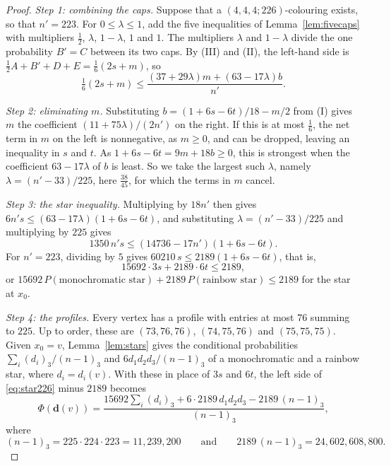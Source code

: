 \documentclass[11pt]{article}
\theoremstyle{spacedplain}
\theoremstyle{spaceddef}
\theoremstyle{spacedremark}
\begin{document}
\begin{proof}
\emph{Step 1: combining the caps.}
Suppose that a $(4,4,4;226)$-colouring exists, so that $n'=223$.
For $0\le\lambda\le 1$, add the five inequalities of Lemma~\ref{lem:fivecaps} with multipliers $\frac12$, $\lambda$, $1-\lambda$, $1$ and $1$.
The multipliers $\lambda$ and $1-\lambda$ divide the one probability $B'=C$ between its two caps.
By (III) and (II), the left-hand side is $\frac12A+B'+D+E=\frac16(2s+m)$, so
\[
\tfrac16(2s+m)\le\frac{(37+29\lambda)m+(63-17\lambda)b}{n'} .
\]

\emph{Step 2: eliminating $m$.}
Substituting $b=(1+6s-6t)/18-m/2$ from (I) gives $m$ the coefficient $(11+75\lambda)/(2n')$ on the right.
If this is at most $\frac16$, the net term in $m$ on the left is nonnegative, as $m\ge 0$, and can be dropped, leaving an inequality in $s$ and $t$.
As $1+6s-6t=9m+18b\ge 0$, this is strongest when the coefficient $63-17\lambda$ of $b$ is least.
So we take the largest such $\lambda$, namely $\lambda=(n'-33)/225$, here $\frac{38}{45}$, for which the terms in $m$ cancel.

\emph{Step 3: the star inequality.}
Multiplying by $18n'$ then gives $6n's\le(63-17\lambda)(1+6s-6t)$, and substituting $\lambda=(n'-33)/225$ and multiplying by $225$ gives
\[
1350\,n's\le(14736-17n')(1+6s-6t).
\]
For $n'=223$, dividing by $5$ gives $60210\,s\le 2189(1+6s-6t)$, that is,
\begin{equation}\label{eq:star226}
15692\cdot 3s+2189\cdot 6t\le 2189,
\end{equation}
or $15692\,P(\text{monochromatic star})+2189\,P(\text{rainbow star})\le 2189$ for the star at $x_0$.

\emph{Step 4: the profiles.}
Every vertex has a profile with entries at most $76$ summing to $225$.
Up to order, these are $(73,76,76)$, $(74,75,76)$ and $(75,75,75)$.
Given $x_0=v$, Lemma~\ref{lem:stars} gives the conditional probabilities $\sum_i(d_i)_3/(n-1)_3$ and $6d_1d_2d_3/(n-1)_3$ of a monochromatic and a rainbow star, where $d_i=d_i(v)$.
With these in place of $3s$ and $6t$, the left side of \eqref{eq:star226} minus $2189$ becomes
\[
\Phi(\mathbf d(v))=\frac{15692\sum_i(d_i)_3+6\cdot 2189\,d_1d_2d_3-2189\,(n-1)_3}{(n-1)_3},
\]
where
\[
(n-1)_3=225\cdot 224\cdot 223=11{,}239{,}200\qquad\text{and}\qquad 2189\,(n-1)_3=24{,}602{,}608{,}800.
\]


\end{proof}
\end{document}
